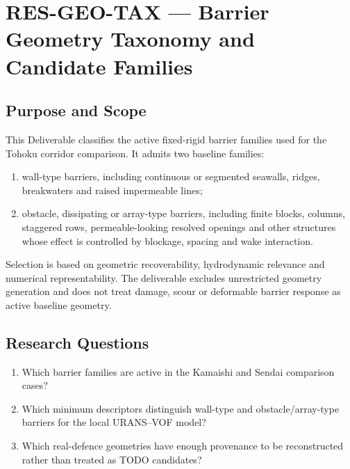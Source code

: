 
\section{RES-GEO-TAX --- Barrier Geometry Taxonomy and Candidate Families}
\label{sec:res-geo-tax}

\subsection{Purpose and Scope}
\label{sec:res-geo-tax-purpose}

This Deliverable classifies the active fixed-rigid barrier families
used for the Tohoku corridor comparison. It admits two baseline
families:

\begin{enumerate}
  \item wall-type barriers, including continuous or segmented seawalls,
    ridges, breakwaters and raised impermeable lines;
  \item obstacle, dissipating or array-type barriers, including finite
    blocks, columns, staggered rows, permeable-looking resolved
    openings and other structures whose effect is controlled by
    blockage, spacing and wake interaction.
\end{enumerate}

Selection is based on geometric recoverability, hydrodynamic relevance
and numerical representability. The deliverable excludes unrestricted
geometry generation and does not treat damage, scour or deformable
barrier response as active baseline geometry.

\subsection{Research Questions}
\label{sec:res-geo-tax-research-questions}

\begin{enumerate}
  \item Which barrier families are active in the Kamaishi and Sendai
    comparison cases?
  \item Which minimum descriptors distinguish wall-type and
    obstacle/array-type barriers for the local URANS--VOF model?
  \item Which real-defence geometries have enough provenance to be
    reconstructed rather than treated as TODO candidates?
\end{enumerate}

